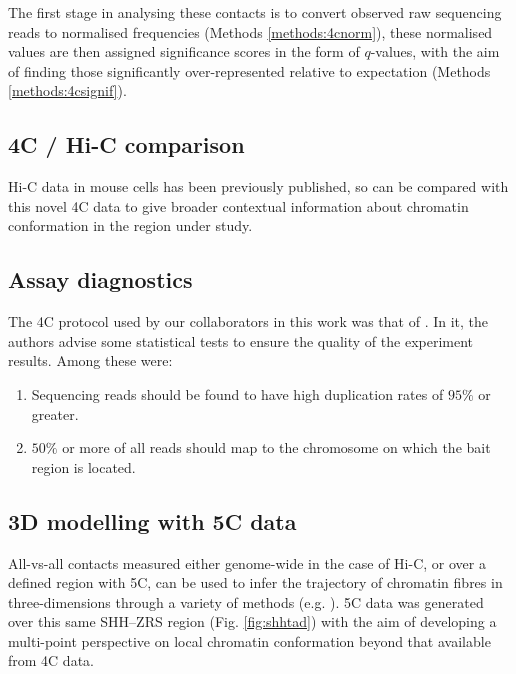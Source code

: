 \documentclass[a4paper,10pt,oneside]{book}
\begin{document}
The first stage in analysing these contacts is to convert observed raw sequencing reads to normalised frequencies (Methods \ref{methods:4cnorm}), these normalised values are then assigned significance scores in the form of $q$-values, with the aim of finding those significantly over-represented relative to expectation (Methods \ref{methods:4csignif}).


\subsection{4C / Hi-C comparison}

Hi-C data in mouse cells has been previously published,\cite{Dixon2012} so can be compared with this novel 4C data to give broader contextual information about chromatin conformation in the region under study.

\subsection{Assay diagnostics}

The 4C protocol used by our collaborators in this work was that of \citet{Stadhouders2013}. In it, the authors advise some statistical tests to ensure the quality of the experiment results. Among these were:\cite{Stadhouders2013}

\begin{enumerate}
\item Sequencing reads should be found to have high duplication rates of $95\%$ or greater.
\item $50\%$ or more of all reads should map to the chromosome on which the bait region is located.
\end{enumerate}

\subsection{3D modelling with 5C data}

All-vs-all contacts measured either genome-wide in the case of Hi-C, or over a defined region with 5C, can be used to infer the trajectory of chromatin fibres in three-dimensions through a variety of methods (e.g. \cite{Hu2013a, Varoquaux2014a, Lesne2014, Trieu2014, Peng2013}). 5C data was generated over this same SHH--ZRS region (Fig. \ref{fig:shhtad}) with the aim of developing a multi-point perspective on local chromatin conformation beyond that available from 4C data.
\end{document}
